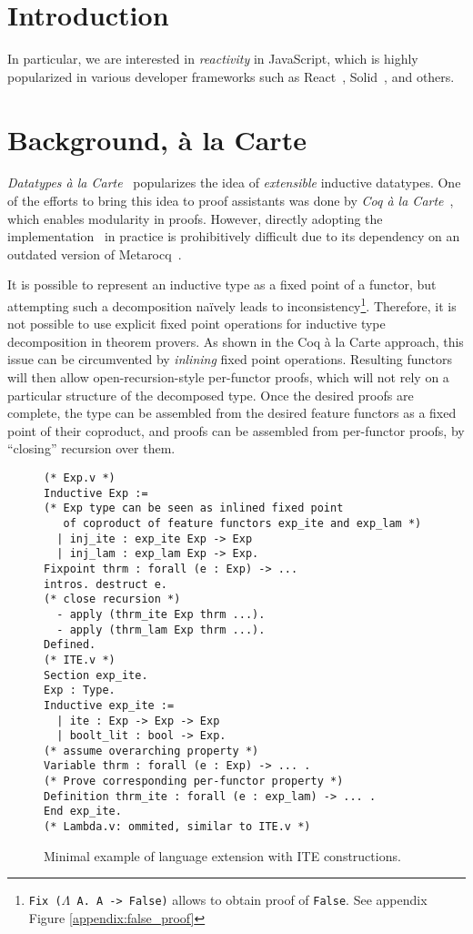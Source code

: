 \documentclass[sigplan,nonacm]{acmart}
\begin{document}
\section{Introduction}


In particular,
we are interested in \emph{reactivity} in JavaScript,
which is highly popularized in various developer frameworks
such as React~\cite{React}, Solid~\cite{Solid}, and others.

\section{Background, à la Carte}

\emph{Datatypes à la Carte}~\cite{swierstra2008data}
popularizes the idea of
\emph{extensible} inductive datatypes. 
One of the efforts to bring this idea to proof assistants
was done by \emph{Coq à la Carte}~\cite{forster2020coq},
which enables modularity in proofs.
However,
directly adopting the implementation~\cite{forster2020coq} in practice
is prohibitively difficult
due to its dependency on an outdated version of Metarocq~\cite{sozeau2020metacoq}.

It is possible to represent an inductive type as a fixed point of a functor,
but attempting such a decomposition na\"ively leads to inconsistency\footnote{\texttt{Fix ($\Lambda$ A. A -> False)} allows to obtain proof of \texttt{False}. See appendix Figure \ref{appendix:false_proof}}. 
Therefore, it is not possible to use explicit fixed point operations for inductive type decomposition in theorem provers.
As shown in the Coq à la Carte approach,
this issue can be circumvented by \emph{inlining} fixed point operations.  
Resulting functors will then allow open-recursion-style per-functor proofs,
which will not rely on a particular structure of the decomposed type.
Once the desired proofs are complete,
the type can be assembled from the desired feature functors as a fixed point of their coproduct,
and proofs can be assembled from
per-functor proofs,
by ``closing'' recursion over them.

\begin{figure}
\begin{lstlisting}[language=Coq]
(* Exp.v *)
Inductive Exp := 
(* Exp type can be seen as inlined fixed point 
   of coproduct of feature functors exp_ite and exp_lam *)
  | inj_ite : exp_ite Exp -> Exp
  | inj_lam : exp_lam Exp -> Exp.
Fixpoint thrm : forall (e : Exp) -> ...
intros. destruct e.
(* close recursion *)
  - apply (thrm_ite Exp thrm ...).
  - apply (thrm_lam Exp thrm ...).
Defined.
(* ITE.v *)
Section exp_ite.
Exp : Type.
Inductive exp_ite := 
  | ite : Exp -> Exp -> Exp
  | boolt_lit : bool -> Exp.
(* assume overarching property *)
Variable thrm : forall (e : Exp) -> ... .
(* Prove corresponding per-functor property *)
Definition thrm_ite : forall (e : exp_lam) -> ... .
End exp_ite.
(* Lambda.v: ommited, similar to ITE.v *)
\end{lstlisting}
  \caption{Minimal example of language extension with ITE constructions.}
  \label{fig:alacart_example}
\end{figure}
\end{document}
